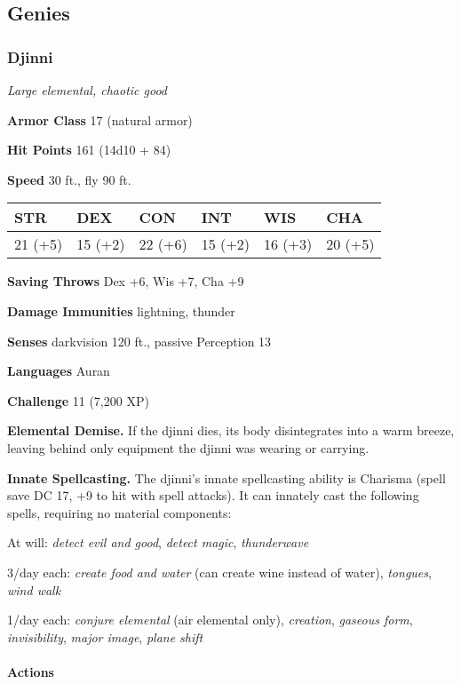 \documentclass[
]{article}
\begin{document}
\hypertarget{genies}{%
\subsection{Genies}\label{genies}}

\hypertarget{djinni}{%
\subsubsection{Djinni}\label{djinni}}

\emph{Large elemental, chaotic good}

\textbf{Armor Class} 17 (natural armor)

\textbf{Hit Points} 161 (14d10 + 84)

\textbf{Speed} 30 ft., fly 90 ft.

\begin{longtable}[]{@{}llllll@{}}
\toprule
STR & DEX & CON & INT & WIS & CHA\tabularnewline
\midrule
\endhead
21 (+5) & 15 (+2) & 22 (+6) & 15 (+2) & 16 (+3) & 20 (+5)\tabularnewline
\bottomrule
\end{longtable}

\textbf{Saving Throws} Dex +6, Wis +7, Cha +9

\textbf{Damage Immunities} lightning, thunder

\textbf{Senses} darkvision 120 ft., passive Perception 13

\textbf{Languages} Auran

\textbf{Challenge} 11 (7,200 XP)

\textbf{Elemental Demise.} If the djinni dies, its body disintegrates
into a warm breeze, leaving behind only equipment the djinni was wearing
or carrying.

\textbf{Innate Spellcasting.} The djinni's innate spellcasting ability
is Charisma (spell save DC 17, +9 to hit with spell attacks). It can
innately cast the following spells, requiring no material components:

At will: \emph{detect evil and good}, \emph{detect magic},
\emph{thunderwave}

3/day each: \emph{create food and water} (can create wine instead of
water), \emph{tongues}, \emph{wind walk}

1/day each: \emph{conjure elemental} (air elemental only),
\emph{creation}, \emph{gaseous form}, \emph{invisibility}, \emph{major
image}, \emph{plane shift}

\hypertarget{actions-1}{%
\paragraph{Actions}\label{actions-1}}
\end{document}
